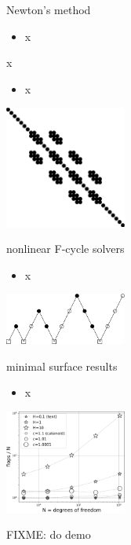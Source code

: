 \documentclass[10pt,
               svgnames,
               hyperref={colorlinks,citecolor=DeepPink4,linkcolor=FireBrick,urlcolor=Maroon},
               usepdftitle=false]{beamer}
\begin{document}
\begin{frame}{Newton's method}
\begin{itemize}
\item x
\end{itemize}
\end{frame}


\begin{frame}{x}
\begin{itemize}
\item x
\end{itemize}

\hfill \includegraphics[width=0.3\textwidth]{images/minimal-spy.png}
\end{frame}


\begin{frame}{nonlinear F-cycle solvers}
\begin{itemize}
\item x
\end{itemize}

\hfill \includegraphics[width=0.3\textwidth]{images/multigrid-fullcycle.png}
\end{frame}


\begin{frame}{minimal surface results}
\begin{itemize}
\item x
\end{itemize}

\hfill \includegraphics[width=0.3\textwidth]{images/minimal-flopsperdof.png}

FIXME: do demo
\end{frame}
\end{document}
